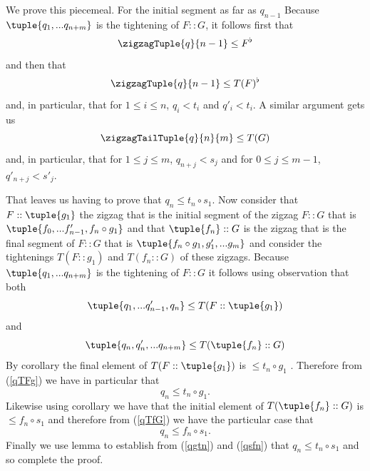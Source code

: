 \begin{oldtt}
We prove this piecemeal. 
For the initial segment as far as $q_{n-1}$ 
Because $\tuple{q_1,...q_{n+m}}$ is the tightening of 
$F :: G$, it follows first that
\[
\zigzagTuple{q}{n-1} \leq F^\flat
\]
and then that
\[
\zigzagTuple{q}{n-1} \leq T(F)^\flat
\] 
and, in particular, that for $1 \leq i \leq n$, $q_i < t_i$ and $q'_i < t_i$.
A similar argument gets us
\[
\zigzagTailTuple{q}{n}{m} \leq T(G)
\]
and, in particular, that 
for $1 \leq j \leq m$, $q_{n+j} < s_j$ and 
for $0 \leq j \leq m-1$, $q'_{n+j} < s'_j$.
\end{oldtt}
\begin{oldtt}
That leaves us having to prove that $q_n \leq t_n \circ s_1$.
Now consider that $F :: \tuple{g_1}$ the zigzag that is
the initial segment of the zigzag $F :: G$
that is $\tuple{f_0,...f'_{n-1},f_n \circ g_1}$
and that $\tuple{f_n} :: G$ is the zigzag that is 
the final segment of $F :: G$
that is $\tuple{f_n \circ g_1,g'_1,...g_m}$
and consider the tightenings $T(F :: g_1)$ and $T(f_n :: G)$ of these zigzags.
Because $\tuple{q_1,...q_{n+m}}$ is the tightening of 
$F :: G$ it follows
using observation   that both
\begin{equation}
\label{qTFg}
\tuple{q_1,...q'_{n-1},q_n} \leq T(F :: \tuple{g_1})
\end{equation} 
and
\begin{equation}
\label{qTfG}
\tuple{q_n, q'_n,...q_{n+m}} \leq T(\tuple{f_n} :: G)
\end{equation}
By corollary  
the final element of $T(F :: \tuple{g_1})$ is $ \leq t_n \circ g_1$ .
Therefore from (\ref{qTFg}) we have in particular that
\begin{equation}
\label{qgtn}
q_n \leq t_n \circ g_1.
\end{equation}
Likewise using corollary  
we have that the initial element
of $T(\tuple{f_n} :: G)$ is $\leq f_n \circ s_1$ and therefore from 
(\ref{qTfG}) we have the particular case that
\begin{equation}
\label{qsfn}
q_n \leq f_n \circ s_1.
\end{equation}
Finally we use lemma  to establish  from
(\ref{qgtn}) and (\ref{qsfn}) that
$q_n \leq  t_n \circ s_1$ and so complete the proof.
\end{oldtt}